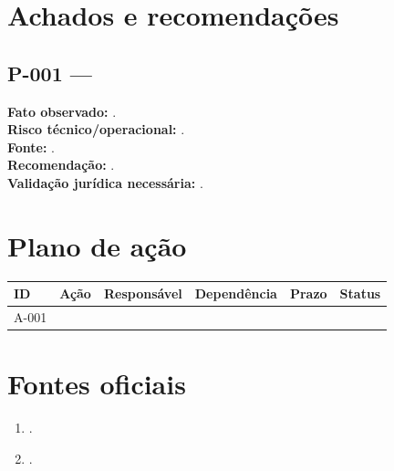 \documentclass[11pt,a4paper]{article}
\begin{document}
\section{Achados e recomendações}
\subsection{P-001 — }
\textbf{Fato observado:} .\\
\textbf{Risco técnico/operacional:} .\\
\textbf{Fonte:} .\\
\textbf{Recomendação:} .\\
\textbf{Validação jurídica necessária:} .

\section{Plano de ação}
\begin{tabularx}{\textwidth}{P{1.2cm}Y P{2.4cm}P{2.1cm}P{1.8cm}P{1.7cm}}
\toprule
\textbf{ID} & \textbf{Ação} & \textbf{Responsável} & \textbf{Dependência} & \textbf{Prazo} & \textbf{Status} \\
\midrule
A-001 &  &  &  &  &  \\
\bottomrule
\end{tabularx}

\section{Fontes oficiais}
\begin{enumerate}
  \item {}.
  \item {}.
\end{enumerate}
\end{document}
